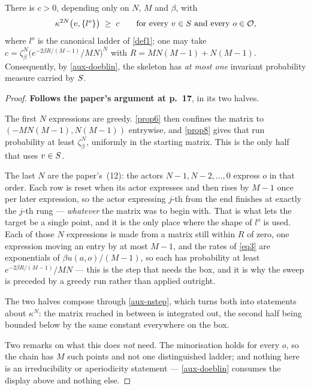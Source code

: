 \begin{lemma}
  \label{aux-minorisation}
  \leanok
  There is $c > 0$, depending only on $N$, $M$ and $\beta$, with
  \[
    \kappa^{2N}\bigl(v, \{l^o\}\bigr) \;\ge\; c
    \qquad \text{for every } v \in S \text{ and every } o \in \mathcal{O},
  \]
  where $l^o$ is the canonical ladder of \ref{def1}; one may take
  $c = \zeta_\beta^N \bigl(e^{-2\beta R/(M-1)}/MN\bigr)^N$ with
  $R = MN(M-1) + N(M-1)$.  Consequently, by \ref{aux-doeblin}, the skeleton has
  \emph{at most one} invariant probability measure carried by $S$.
\end{lemma}
\begin{proof}
  \leanok
  \textbf{Follows the paper's argument at p.~17}, in its two halves.

  The first $N$ expressions are greedy.  \ref{prop6} then confines the matrix
  to $(-MN(M-1), N(M-1))$ entrywise, and \ref{prop8} gives that run
  probability at least $\zeta_\beta^N$, uniformly in the starting matrix.  This
  is the only half that uses $v \in S$.

  The last $N$ are the paper's~(12): the actors $N-1, N-2, \dots, 0$ express
  $o$ in that order.  Each row is reset when its actor expresses and then rises
  by $M-1$ once per later expression, so the actor expressing $j$-th from the
  end finishes at exactly the $j$-th rung --- \emph{whatever} the matrix was to
  begin with.  That is what lets the target be a single point, and it is the
  only place where the shape of $l^o$ is used.  Each of those $N$ expressions
  is made from a matrix still within $R$ of zero, one expression moving an
  entry by at most $M-1$, and the rates of \ref{eq3} are exponentials of
  $\beta u(a,o)/(M-1)$, so each has probability at least
  $e^{-2\beta R/(M-1)}/MN$ --- this is the step that needs the box, and it is
  why the sweep is preceded by a greedy run rather than applied outright.

  The two halves compose through \ref{aux-nstep}, which turns both into
  statements about $\kappa^N$: the matrix reached in between is integrated out,
  the second half being bounded below by the same constant everywhere on the
  box.

  Two remarks on what this does \emph{not} need.  The minorisation holds for
  every $o$, so the chain has $M$ such points and not one distinguished
  ladder; and nothing here is an irreducibility or aperiodicity statement ---
  \ref{aux-doeblin} consumes the display above and nothing else.
\end{proof}

